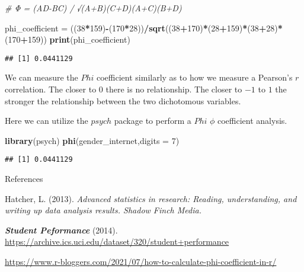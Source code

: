 \documentclass[
]{book}
\newenvironment{Shaded}{\begin{snugshade}}{\end{snugshade}}
\newcommand{\AttributeTok}[1]{\textcolor[rgb]{0.13,0.29,0.53}{#1}}
\newcommand{\CommentTok}[1]{\textcolor[rgb]{0.56,0.35,0.01}{\textit{#1}}}
\newcommand{\DecValTok}[1]{\textcolor[rgb]{0.00,0.00,0.81}{#1}}
\newcommand{\FunctionTok}[1]{\textcolor[rgb]{0.13,0.29,0.53}{\textbf{#1}}}
\newcommand{\NormalTok}[1]{#1}
\newcommand{\OtherTok}[1]{\textcolor[rgb]{0.56,0.35,0.01}{#1}}
\newcommand{\SpecialCharTok}[1]{\textcolor[rgb]{0.81,0.36,0.00}{\textbf{#1}}}
\theoremstyle{definition}
\theoremstyle{definition}
\theoremstyle{definition}
\theoremstyle{definition}
\theoremstyle{remark}
\begin{document}
\begin{Shaded}
\begin{Highlighting}[]
\CommentTok{\# Φ = (AD{-}BC) / √(A+B)(C+D)(A+C)(B+D)}

\NormalTok{phi\_coefficient }\OtherTok{=}\NormalTok{ ((}\DecValTok{38}\SpecialCharTok{*}\DecValTok{159}\NormalTok{)}\SpecialCharTok{{-}}\NormalTok{(}\DecValTok{170}\SpecialCharTok{*}\DecValTok{28}\NormalTok{))}\SpecialCharTok{/}\FunctionTok{sqrt}\NormalTok{((}\DecValTok{38}\SpecialCharTok{+}\DecValTok{170}\NormalTok{)}\SpecialCharTok{*}\NormalTok{(}\DecValTok{28}\SpecialCharTok{+}\DecValTok{159}\NormalTok{)}\SpecialCharTok{*}\NormalTok{(}\DecValTok{38}\SpecialCharTok{+}\DecValTok{28}\NormalTok{)}\SpecialCharTok{*}\NormalTok{(}\DecValTok{170}\SpecialCharTok{+}\DecValTok{159}\NormalTok{))}
\FunctionTok{print}\NormalTok{(phi\_coefficient)}
\end{Highlighting}
\end{Shaded}

\begin{verbatim}
## [1] 0.0441129
\end{verbatim}

We can measure the \(Phi\) coefficient similarly as to how we measure a Pearson's \(r\) correlation. The closer to \(0\) there is no relationship. The closer to \(-1\) to \(1\) the stronger the relationship between the two dichotomous variables.

Here we can utilize the \(psych\) package to perform a \(Phi\) \(\phi\) coefficient analysis.

\begin{Shaded}
\begin{Highlighting}[]
\FunctionTok{library}\NormalTok{(psych)}
\FunctionTok{phi}\NormalTok{(gender\_internet,}\AttributeTok{digits =} \DecValTok{7}\NormalTok{)}
\end{Highlighting}
\end{Shaded}

\begin{verbatim}
## [1] 0.0441129
\end{verbatim}

References

Hatcher, L. (2013). \emph{Advanced statistics in research: Reading, understanding, and writing up data analysis results. Shadow Finch Media.}

\textbf{\emph{Student Peformance}} (2014). \url{https://archive.ics.uci.edu/dataset/320/student+performance}

\url{https://www.r-bloggers.com/2021/07/how-to-calculate-phi-coefficient-in-r/}
\end{document}
